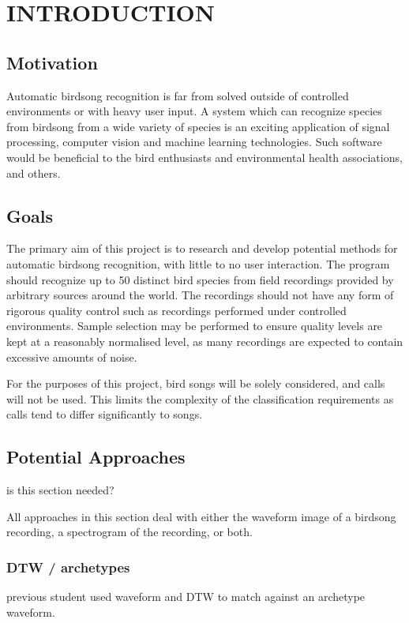 \chapter{INTRODUCTION}

\section{Motivation}
Automatic birdsong recognition is far from solved outside of controlled
environments or with heavy user input.
A system which can recognize species from birdsong from a wide variety of
species is an exciting application of signal processing, computer vision and
machine learning technologies.
Such software would be beneficial to the bird enthusiasts and environmental
health associations, and others.

\section{Goals}
The primary aim of this project is to research and develop potential methods
for automatic birdsong recognition, with little to no user interaction.
The program should recognize up to 50 distinct bird species from field recordings
provided by arbitrary sources around the world.
The recordings should not have any form of rigorous quality control such as
recordings performed under controlled environments.
Sample selection may be performed to ensure quality levels are kept at a
reasonably normalised level, as many recordings are expected to contain
excessive amounts of noise.

For the purposes of this project, bird songs will be solely considered, and calls
will not be used.
This limits the complexity of the classification requirements as calls tend to
differ significantly to songs.

\section{Potential Approaches}
is this section needed?

All approaches in this section deal with either the waveform image of a birdsong
recording, a spectrogram of the recording, or both.

\subsection{DTW / archetypes}
previous student used waveform and DTW to match against an archetype waveform.

